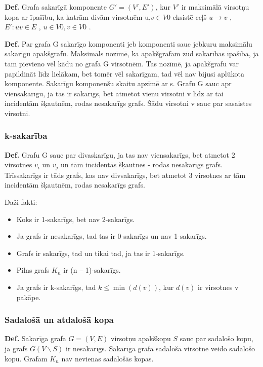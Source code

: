 \documentclass{article}
\begin{document}
\textbf{Def.}  Grafa sakarīgā komponente $G'=(V',E')$, kur $V'$ ir maksimālā virsotņu kopa ar īpašību, ka katrām divām virsotnēm u,$v \in V 0$ eksistē ceļš $ u → v$ , $E':uv \in E$ , $u \in V 0 , v \in V 0$ . 

\textbf{Def.}  Par grafa G sakarīgo komponenti jeb komponenti sauc jebkuru maksimālu sakarīgu apakšgrafu.
Maksimāls nozīmē, ka apakšgrafam zūd sakarības īpašība, ja tam pievieno vēl kādu no grafa G virsotnēm. Tas nozīmē, ja apakšgrafu var papildināt līdz lielākam, bet tomēr vēl sakarīgam, tad vēl nav bijusi aplūkota komponente.  Sakarīgu komponenšu skaitu apzīmē ar s.  Grafu G sauc apr viensakarīgu, ja tas ir sakarīgs, bet atmetot vienu virsotni v līdz ar tai incidentām šķautnēm, rodas nesakarīgs grafs. Šādu virsotni v sauc par sasaistes virsotni.

\subsubsection{k-sakarība}

\textbf{Def.} Grafu G sauc par divaskarīgu, ja tas nav viensakarīgs, bet atmetot 2 virsotnes $v_i$ un $v_j$ un tām incidentās šķautnes - rodas nesakarīgs grafs. Trīssakarīgs ir tāds grafs, kas nav divsakarīgs, bet atmetot 3 virsotnes ar tām incidentām šķautnēm, rodas nesakarīgs grafs.

Daži fakti:
\begin{itemize}
	\item Koks ir 1-sakarīgs, bet nav 2-sakarīgs.
	\item Ja grafs ir nesakarīgs, tad tas ir 0-sakarīgs un nav 1-sakarīgs.
	\item Grafs ir sakarīgs, tad un tikai tad, ja tas ir 1-sakarīgs.
	\item Pilns grafs $K_n$ ir (n – 1)-sakarīgs.
	\item Ja grafs ir k-sakarīgs, tad $k \le \min(d(v))$, kur $d(v)$ ir virsotnes v pakāpe.
\end{itemize}

\subsubsection{Sadalošā un atdalošā kopa}

\textbf{Def.}  Sakarīga grafa $G = (V, E)$ virsotņu apakškopu $S$ sauc par sadalošo kopu, ja grafs $G(V \backslash S)$ ir nesakarīgs.
Sakarīga grafa sadalošā virsotne veido sadalošo kopu.  Grafam $K_n$ nav nevienas sadalošās kopas.
\end{document}
